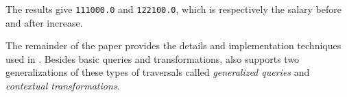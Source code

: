 
The results give \lstinline{111000.0} and \lstinline{122100.0}, which
is respectively the salary before and after increase.

The remainder of the paper provides the details and implementation
techniques used in \Name. Besides basic queries and transformations,
\name also supports two generalizations of these types of traversals
called \emph{generalized queries} and \emph{contextual transformations}.

